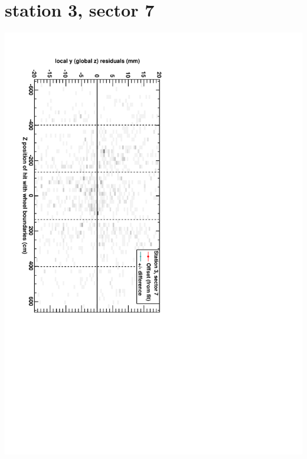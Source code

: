 \documentclass[compress]{beamer}
\begin{document}
\section*{station 3, sector 7}
\begin{frame} \vfill \mbox{\hspace{-1 cm}\includegraphics[height=1.2\linewidth, angle=90]{DTzVsZ_st3_sr07.pdf}} \end{frame}
\end{document}
